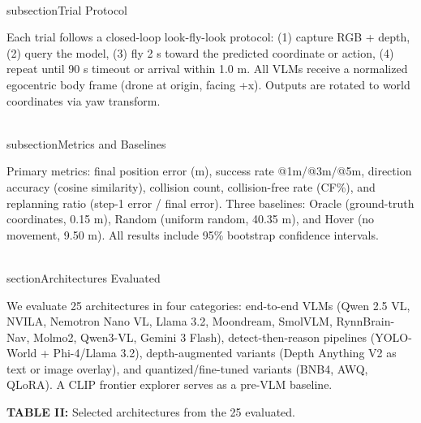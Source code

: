 \documentclass[conference]{IEEEtran}
\begin{document}
\\subsection{Trial Protocol}\label{c.-trial-protocol}

Each trial follows a closed-loop look-fly-look protocol: (1) capture RGB
+ depth, (2) query the model, (3) fly 2 s toward the predicted
coordinate or action, (4) repeat until 90 s timeout or arrival within
1.0 m. All VLMs receive a normalized egocentric body frame (drone at
origin, facing +x). Outputs are rotated to world coordinates via yaw
transform.

\\subsection{Metrics and Baselines}\label{d.-metrics-and-baselines}

Primary metrics: final position error (m), success rate @1m/@3m/@5m,
direction accuracy (cosine similarity), collision count, collision-free
rate (CF\%), and replanning ratio (step-1 error / final error). Three
baselines: Oracle (ground-truth coordinates, 0.15 m), Random (uniform
random, 40.35 m), and Hover (no movement, 9.50 m). All results include
95\% bootstrap confidence intervals.

\\section{Architectures Evaluated}\label{iv.-architectures-evaluated}

We evaluate 25 architectures in four categories: end-to-end VLMs (Qwen
2.5 VL, NVILA, Nemotron Nano VL, Llama 3.2, Moondream, SmolVLM,
RynnBrain-Nav, Molmo2, Qwen3-VL, Gemini 3 Flash), detect-then-reason
pipelines (YOLO-World + Phi-4/Llama 3.2), depth-augmented variants
(Depth Anything V2 as text or image overlay), and quantized/fine-tuned
variants (BNB4, AWQ, QLoRA). A CLIP frontier explorer serves as a
pre-VLM baseline.

\textbf{TABLE II:} Selected architectures from the 25 evaluated.
\end{document}
